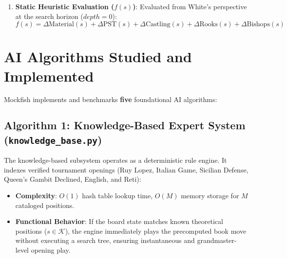 \documentclass[11pt,a4paper]{article}
\begin{document}
\begin{enumerate}[leftmargin=*]
$$\begin{cases}
    -20,000 - depth & \text{if Checkmate, Turn}(s) = \text{White (Black Wins)} \\
    0.00 & \text{if Stalemate, Insufficient Material, 3-Fold Repetition, 50-Move Rule}
    \end{cases}$$
    Factoring remaining search $depth$ into the terminal utility ensures the agent prioritizes the \textit{fastest possible checkmates} when winning and the \textit{longest survival delays} when defending.
    \item \textbf{Static Heuristic Evaluation ($f(s)$)}: Evaluated from White's perspective at the search horizon ($depth = 0$):
    $$f(s) = \Delta \text{Material}(s) + \Delta \text{PST}(s) + \Delta \text{Castling}(s) + \Delta \text{Rooks}(s) + \Delta \text{Bishops}(s)$$
\end{enumerate}

\section{AI Algorithms Studied and Implemented}

Mockfish implements and benchmarks \textbf{five} foundational AI algorithms:

\subsection{Algorithm 1: Knowledge-Based Expert System (\texttt{knowledge\_base.py})}
The knowledge-based subsystem operates as a deterministic rule engine. It indexes verified tournament openings (Ruy Lopez, Italian Game, Sicilian Defense, Queen's Gambit Declined, English, and Reti):
\begin{itemize}[leftmargin=*]
    \item \textbf{Complexity}: $O(1)$ hash table lookup time, $O(M)$ memory storage for $M$ cataloged positions.
    \item \textbf{Functional Behavior}: If the board state matches known theoretical positions ($s \in \mathcal{K}$), the engine immediately plays the precomputed book move without executing a search tree, ensuring instantaneous and grandmaster-level opening play.
\end{itemize}
\end{document}
